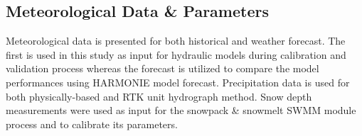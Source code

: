 















\subsection{Meteorological Data \& Parameters} \label{meteodata}

Meteorological data is presented for both historical and weather forecast. The first is used in this study as input for hydraulic models during calibration and validation process whereas the forecast is utilized to compare the model performances using HARMONIE model forecast. Precipitation data is used for both physically-based and RTK unit hydrograph method. Snow depth measurements were used as input for the snowpack \& snowmelt SWMM module process and to calibrate its parameters.


